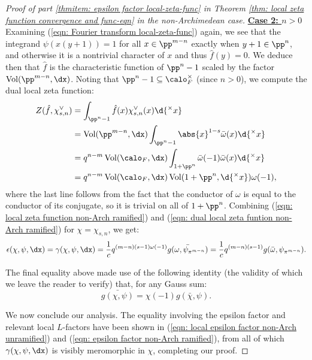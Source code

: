 \documentclass[11pt, x11names, openany]{book}
\begin{document}
\begin{proof}[Proof of part \ref{thmitem: epsilon factor local-zeta-func} in Theorem \ref{thm: local zeta function convergence and func-eqn} in the non-Archimedean case]
\textbf{\underline{Case 2: $n > 0$}}\\
Examining (\ref{eqn: Fourier transform local-zeta-func}) again, we see that the integrand $\psi(x(y+1)) = 1$ for all $x \in \pp^{m-n}$ exactly when $y + 1 \in \pp^n$, and otherwise it is a nontrivial character of $x$ and thus $\hat{f}(y) = 0$. We deduce then that $\hat{f}$ is the characteristic function of $\pp^n - 1$ scaled by the factor $\vol(\pp^{m-n}, \dx)$. Noting that $\pp^n - 1 \subseteq \calo_F^\times$ (since $n > 0$), we compute the dual local zeta function:
\begin{align}
\label{eqn: dual local zeta funtion non-Arch ramified}
    Z(\hat{f}, \chi^\lor_{s, n}) &= \int_{\pp^n - 1} \hat{f}(x) \chi^\lor_{s, n}(x) \d{^\times x} \nonumber \\
    &= \vol(\pp^{m-n}, \dx) \int_{\pp^n - 1} \abs{x}^{1-s} \bar{\omega}(x) \d{^\times x} \nonumber \\
    &= q^{n-m} \vol(\calo_F, \dx) \int_{1 + \pp^n} \bar{\omega}(-1)\bar{\omega}(x) \d{^\times x} \nonumber \\
    &= q^{n-m} \vol(\calo_F, \dx) \vol(1 + \pp^n, \d{^\times x}) \omega(-1),
\end{align}
where the last line follows from the fact that the conductor of $\omega$ is equal to the conductor of its conjugate, so it is trivial on all of $1 + \pp^n$. Combining (\ref{eqn: local zeta function non-Arch ramified}) and (\ref{eqn: dual local zeta funtion non-Arch ramified}) for $\chi = \chi_{s, n}$, we get:
\begin{equation}
\label{eqn: epsilon factor non-Arch ramified}
    \epsilon(\chi, \psi, \dx) = \gamma(\chi, \psi, \dx) = \frac{1}{c} q^{(m-n)(s-1) \omega(-1)} \bar{ g( \omega, \psi_{\pi^{m-n}})} = \frac{1}{c}q^{(m-n)(s-1)}g(\bar{\omega}, \psi_{\pi^{m-n}}).
\end{equation}

The final equality above made use of the following identity (the validity of which we leave the reader to verify) that, for any Gauss sum:
\begin{equation*}
    \bar{g(\chi, \psi)} = \chi(-1) g(\bar{\chi}, \psi).
\end{equation*}

We now conclude our analysis. The equality involving the epsilon factor and relevant local $L$-factors have been shown in (\ref{eqn: local epsilon factor non-Arch unramified}) and (\ref{eqn: epsilon factor non-Arch ramified}), from all of which $\gamma(\chi, \psi, \dx)$ is visibly meromorphic in $\chi$, completing our proof.
\end{proof}
\end{document}
